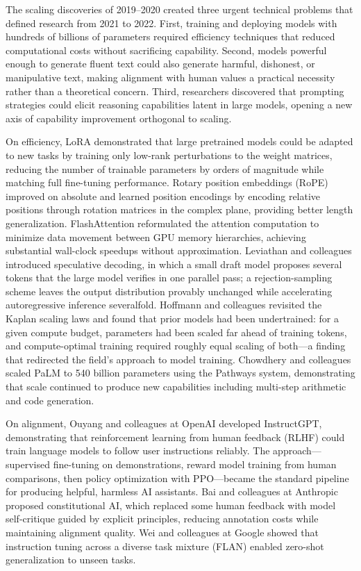 
The scaling discoveries of 2019--2020 created three urgent technical problems that defined research from 2021 to 2022. First, training and deploying models with hundreds of billions of parameters required efficiency techniques that reduced computational costs without sacrificing capability. Second, models powerful enough to generate fluent text could also generate harmful, dishonest, or manipulative text, making alignment with human values a practical necessity rather than a theoretical concern. Third, researchers discovered that prompting strategies could elicit reasoning capabilities latent in large models, opening a new axis of capability improvement orthogonal to scaling.

On efficiency, LoRA demonstrated that large pretrained models could be adapted to new tasks by training only low-rank perturbations to the weight matrices, reducing the number of trainable parameters by orders of magnitude while matching full fine-tuning performance. Rotary position embeddings (RoPE) improved on absolute and learned position encodings by encoding relative positions through rotation matrices in the complex plane, providing better length generalization. FlashAttention reformulated the attention computation to minimize data movement between GPU memory hierarchies, achieving substantial wall-clock speedups without approximation. Leviathan and colleagues introduced speculative decoding, in which a small draft model proposes several tokens that the large model verifies in one parallel pass; a rejection-sampling scheme leaves the output distribution provably unchanged while accelerating autoregressive inference severalfold. Hoffmann and colleagues revisited the Kaplan scaling laws and found that prior models had been undertrained: for a given compute budget, parameters had been scaled far ahead of training tokens, and compute-optimal training required roughly equal scaling of both---a finding that redirected the field's approach to model training. Chowdhery and colleagues scaled PaLM to 540 billion parameters using the Pathways system, demonstrating that scale continued to produce new capabilities including multi-step arithmetic and code generation.

On alignment, Ouyang and colleagues at OpenAI developed InstructGPT, demonstrating that reinforcement learning from human feedback (RLHF) could train language models to follow user instructions reliably. The approach---supervised fine-tuning on demonstrations, reward model training from human comparisons, then policy optimization with PPO---became the standard pipeline for producing helpful, harmless AI assistants. Bai and colleagues at Anthropic proposed constitutional AI, which replaced some human feedback with model self-critique guided by explicit principles, reducing annotation costs while maintaining alignment quality. Wei and colleagues at Google showed that instruction tuning across a diverse task mixture (FLAN) enabled zero-shot generalization to unseen tasks.

